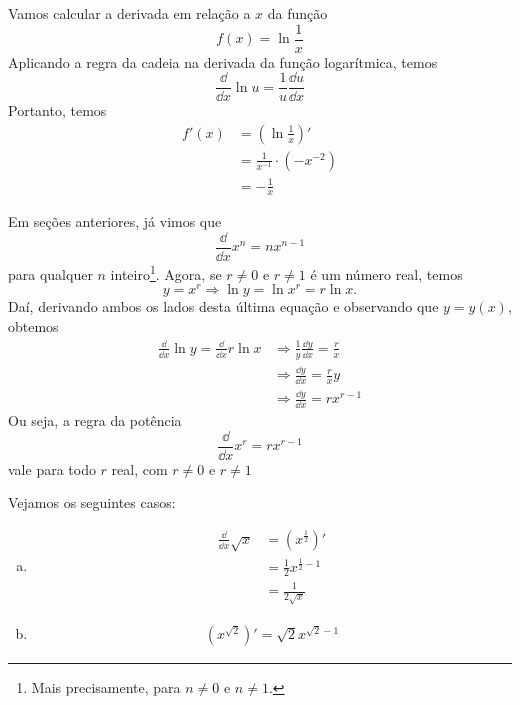 \cleardoublepage\documentclass[../main.tex]{subfiles}
\begin{document}
\begin{ex}
  Vamos calcular a derivada em relação a $x$ da função
  \begin{equation}
    f(x) = \ln \frac{1}{x}
  \end{equation}
  Aplicando a regra da cadeia na derivada da função logarítmica, temos
  \begin{equation}
    \frac{\dd}{\dd x}\ln u = \frac{1}{u}\frac{\dd u}{\dd x}
  \end{equation}
  Portanto, temos
  \begin{align*}
    f'(x) &= \left(\ln\frac{1}{x}\right)'\\
          &= \frac{1}{x^{-1}}\cdot (-x^{-2}) \\
          &= -\frac{1}{x}
  \end{align*}
\end{ex}

\begin{obs}
  Em seções anteriores, já vimos que
  \begin{equation}
    \frac{\dd}{\dd x}x^n = nx^{n-1}
  \end{equation}
  para qualquer $n$ inteiro\footnote{Mais precisamente, para $n\neq 0$ e $n\neq 1$.}. Agora, se $r\neq 0$ e $r\neq 1$ é um número real, temos
  \begin{equation}
    y = x^r \Rightarrow \ln y = \ln x^r = r\ln x.
  \end{equation}
  Daí, derivando ambos os lados desta última equação e observando que $y = y(x)$, obtemos
  \begin{align*}
    \frac{\dd}{\dd x} \ln y = \frac{\dd}{\dd x} r\ln x &\Rightarrow \frac{1}{y}\frac{\dd y}{\dd x} = \frac{r}{x}\\
                                                       &\Rightarrow \frac{\dd y}{\dd x} = \frac{r}{x}y\\
                                                       &\Rightarrow \frac{\dd y}{\dd x} = rx^{r-1}
  \end{align*}
  Ou seja, a regra da potência
  \begin{equation}
    \frac{\dd}{\dd x}x^r = rx^{r-1}
  \end{equation}
  vale para todo $r$ real, com $r\neq 0$ e $r\neq 1$
\end{obs}

\begin{ex}
  Vejamos os seguintes casos:
  \begin{enumerate}[a)]
  \item
    \begin{align*}
      \frac{\dd}{\dd x}\sqrt{x} &= \left(x^{\frac{1}{2}}\right)' \\
                                &= \frac{1}{2}x^{\frac{1}{2}-1} \\
                                &= \frac{1}{2\sqrt{x}}
    \end{align*}
  \item
    \begin{align}
      \left(x^{\sqrt{2}}\right)' = \sqrt{2}x^{\sqrt{2}-1}
    \end{align}
  \end{enumerate}
\end{ex}
\end{document}
